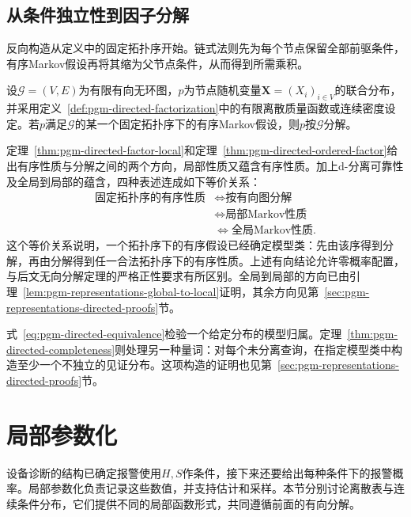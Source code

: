 \subsection{从条件独立性到因子分解}
\label{sec:pgm-directed-ci-to-factor}

反向构造从定义中的固定拓扑序开始。链式法则先为每个节点保留全部前驱条件，有序Markov假设再将其缩为父节点条件，从而得到所需乘积。

\begin{theorem}[有序假设导出有向分解]
  \label{thm:pgm-directed-ordered-factor}
  设$\mathcal{G}=(V,E)$为有限有向无环图，$p$为节点随机变量$\bm{X}=(X_i)_{i\in V}$的联合分布，并采用定义~\ref{def:pgm-directed-factorization}中的有限离散质量函数或连续密度设定。若$p$满足$\mathcal{G}$的某一个固定拓扑序下的有序Markov假设，则$p$按$\mathcal{G}$分解。
\end{theorem}

定理~\ref{thm:pgm-directed-factor-local}和定理~\ref{thm:pgm-directed-ordered-factor}给出有序性质与分解之间的两个方向，局部性质又蕴含有序性质。加上d-分离可靠性及全局到局部的蕴含，四种表述连成如下等价关系：
\begin{equation}
  \begin{aligned}
    \text{固定拓扑序的有序性质}
      &\Longleftrightarrow \text{按有向图分解}\\
      &\Longleftrightarrow \text{局部Markov性质}\\
      &\Longleftrightarrow \text{全局Markov性质}.
  \end{aligned}
  \label{eq:pgm-directed-equivalence}
\end{equation}
这个等价关系说明，一个拓扑序下的有序假设已经确定模型类：先由该序得到分解，再由分解得到任一合法拓扑序下的有序性质。上述有向结论允许零概率配置，与后文无向分解定理的严格正性要求有所区别。全局到局部的方向已由引理~\ref{lem:pgm-representations-global-to-local}证明，其余方向见第~\ref{sec:pgm-representations-directed-proofs}节。

式~\eqref{eq:pgm-directed-equivalence}检验一个给定分布的模型归属。定理~\ref{thm:pgm-directed-completeness}则处理另一种量词：对每个未分离查询，在指定模型类中构造至少一个不独立的见证分布。这项构造的证明也见第~\ref{sec:pgm-representations-directed-proofs}节。

\section{局部参数化}
\label{sec:pgm-directed-local-parameterization}

设备诊断的结构已确定报警使用$H,S$作条件，接下来还要给出每种条件下的报警概率。局部参数化负责记录这些数值，并支持估计和采样。本节分别讨论离散表与连续条件分布，它们提供不同的局部函数形式，共同遵循前面的有向分解。

